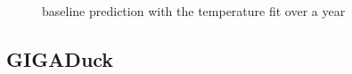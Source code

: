 \begin{figure}[!ht]
  \centering
  \hspace*{-3ex}
  \\
  \caption{baseline prediction with the temperature fit over a year}
  \label{fig:prediction1}
\end{figure}

\newpage
\subsection{GIGADuck}
\begin{figure}[!ht]
  \centering
  \hspace*{-3ex}
  \caption{}
  \label{fig:gigaduck}
\end{figure}

\begin{figure}[!ht]
  \centering
  \hspace*{-3ex}
  \caption{}
  \label{fig:gigaduck}
\end{figure}
